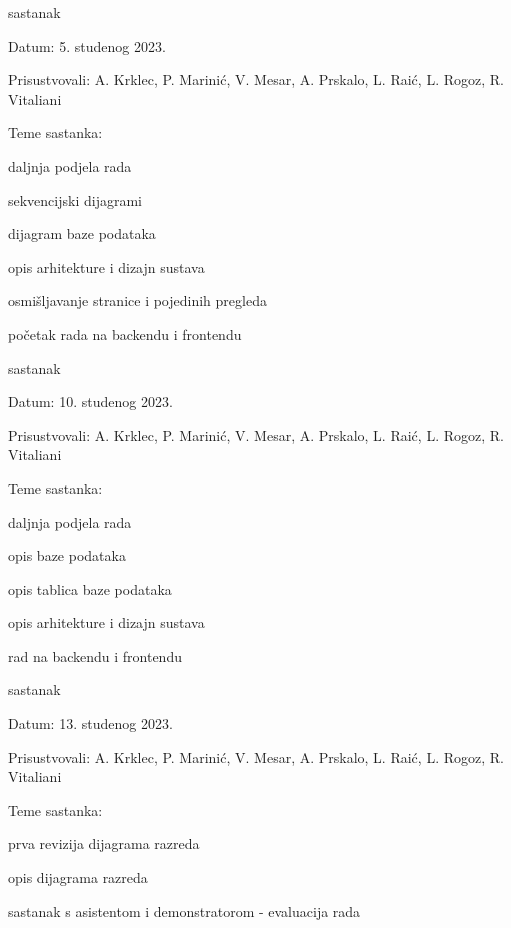 \begin{packed_enum}
	\item  sastanak
	\item[] \begin{packed_item}
		\item Datum: 5. studenog 2023.
		\item Prisustvovali: A. Krklec, P. Marinić, V. Mesar, A. Prskalo, L. Raić, L. Rogoz, R. Vitaliani
		\item Teme sastanka:
		\begin{packed_item}
			\item daljnja podjela rada
			\item sekvencijski dijagrami
			\item dijagram baze podataka
			\item opis arhitekture i dizajn sustava
			\item osmišljavanje stranice i pojedinih pregleda
			\item početak rada na backendu i frontendu
		\end{packed_item}
	\end{packed_item}
	
	\item  sastanak
	\item[] \begin{packed_item}
		\item Datum: 10. studenog 2023.
		\item Prisustvovali: A. Krklec, P. Marinić, V. Mesar, A. Prskalo, L. Raić, L. Rogoz, R. Vitaliani
		\item Teme sastanka:
		\begin{packed_item}
			\item daljnja podjela rada
			\item opis baze podataka
			\item opis tablica baze podataka
			\item opis arhitekture i dizajn sustava
			\item rad na backendu i frontendu
		\end{packed_item}
	\end{packed_item}
	
	\item  sastanak
	\item[] \begin{packed_item}
		\item Datum: 13. studenog 2023.
		\item Prisustvovali: A. Krklec, P. Marinić, V. Mesar, A. Prskalo, L. Raić, L. Rogoz, R. Vitaliani
		\item Teme sastanka:
		\begin{packed_item}
			\item prva revizija dijagrama razreda
			\item opis dijagrama razreda
			\item sastanak s asistentom i demonstratorom - evaluacija rada
		\end{packed_item}
	\end{packed_item}
	

\end{packed_enum}
